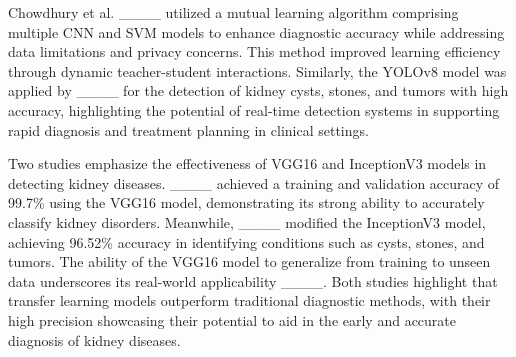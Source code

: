 Chowdhury et al. ____ utilized a mutual learning algorithm comprising multiple CNN and SVM models to enhance diagnostic accuracy while addressing data limitations and privacy concerns. This method improved learning efficiency through dynamic teacher-student interactions. Similarly, the YOLOv8 model was applied by ____ for the detection of kidney cysts, stones, and tumors with high accuracy, highlighting the potential of real-time detection systems in supporting rapid diagnosis and treatment planning in clinical settings.

Two studies emphasize the effectiveness of VGG16 and InceptionV3 models in detecting kidney diseases. ____ achieved a training and validation accuracy of 99.7\% using the VGG16 model, demonstrating its strong ability to accurately classify kidney disorders. Meanwhile, ____ modified the InceptionV3 model, achieving 96.52\% accuracy in identifying conditions such as cysts, stones, and tumors. The ability of the VGG16 model to generalize from training to unseen data underscores its real-world applicability ____. Both studies highlight that transfer learning models outperform traditional diagnostic methods, with their high precision showcasing their potential to aid in the early and accurate diagnosis of kidney diseases.

